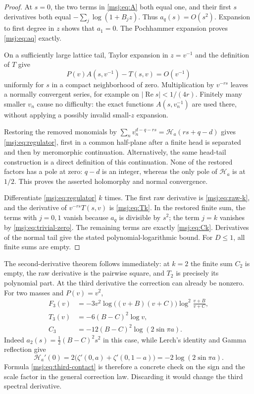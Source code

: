 \documentclass[11pt,a4paper]{article}
\numberwithin{equation}{section}
\theoremstyle{plain}
\theoremstyle{definition}
\theoremstyle{remark}
\begin{document}
\begin{proof}
At $s=0$, the two terms in \eqref{msj:eq:A} both equal one, and their
first $s$ derivatives both equal $-\sum_j\log(1+B_jz)$. Thus
$a_q(s)=O(s^2)$. Expansion to first degree in $z$ shows that $a_1=0$.
The Pochhammer expansion proves \eqref{msj:eq:aq} exactly.

On a sufficiently large lattice tail, Taylor expansion in $z=v^{-1}$
and the definition of $T$ give
\[
 P(v)A(s,v^{-1})-T(s,v)=O(v^{-1})
\]
uniformly for $s$ in a compact neighborhood of zero. Multiplication by
$v^{-rs}$ leaves a normally convergent series, for example on
$|\operatorname{Re}s|<1/(4r)$. Finitely many smaller $v_n$ cause no
difficulty: the exact functions $A(s,v_n^{-1})$ are used there,
without applying a possibly invalid small-$z$ expansion.

Restoring the removed monomials by
$\sum_n v_n^{d-q-rs}=\mathcal H_a(rs+q-d)$ gives
\eqref{msj:eq:regulator}, first in a common half-plane after a finite
head is separated and then by meromorphic continuation. Alternatively,
the same head-tail construction is a direct definition of this
continuation. None of the restored factors has a pole at zero:
$q-d$ is an integer, whereas the only pole of $\mathcal H_a$ is at
$1/2$. This proves the asserted holomorphy and normal convergence.

Differentiate \eqref{msj:eq:regulator} $k$ times. The first raw
derivative is \eqref{msj:eq:raw-k}, and the derivative of
$v^{-rs}T(s,v)$ is \eqref{msj:eq:Tk}. In the restored finite sum,
the terms with $j=0,1$ vanish because $a_q$ is divisible by $s^2$;
the term $j=k$ vanishes by \eqref{msj:eq:trivial-zero}. The remaining
terms are exactly \eqref{msj:eq:Ck}. Derivatives of the normal tail
give the stated polynomial-logarithmic bound. For $D\le1$, all finite
sums are empty.
\end{proof}

The second-derivative theorem follows immediately: at $k=2$ the
finite sum $C_2$ is empty, the raw derivative is the pairwise square,
and $T_2$ is precisely its polynomial part. At the third derivative
the correction can already be nonzero. For two masses and $P(v)=v^2$,
\begin{align}
 F_3(v)&=-3v^2\log\bigl((v+B)(v+C)\bigr)
                         \log^2\frac{v+B}{v+C},
 \label{msj:eq:third-raw}\\
 T_3(v)&=-6(B-C)^2\log v,
 \label{msj:eq:third-subtraction}\\
 C_3&=-12(B-C)^2\log(2\sin\pi a).
 \label{msj:eq:third-contact}
\end{align}
Indeed $a_2(s)=\tfrac12(B-C)^2s^2$ in this case, while Lerch's
identity and Gamma reflection give
\[
 \mathcal H_a'(0)=2\bigl(\zeta'(0,a)+\zeta'(0,1-a)\bigr)
                 =-2\log(2\sin\pi a).
\]
Formula \eqref{msj:eq:third-contact} is therefore a concrete check on
the sign and the scale factor in the general correction law. Discarding
it would change the third spectral derivative.
\end{document}
